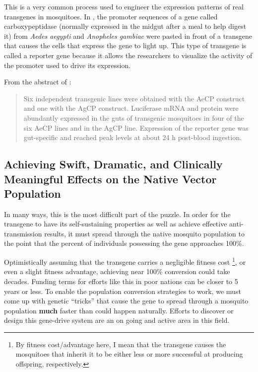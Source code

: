 This is a very common process used to engineer the expression patterns of real transgenes in mosquitoes.
In \cite{Moreira2000}, the promoter sequences of a gene called carboxypeptidase (normally expressed in the midgut after a meal to help digest it) from \emph{Aedes aegypti} and \emph{Anopheles gambiae} were pasted in front of a transgene that causes the cells that express the gene to light up.
This type of transgene is called a \gls{reporter gene} because it allows the researchers to visualize the activity of the promoter used to drive its expression.

From the abstract of \cite{Moreira2000}:

\begin{quote}
Six independent transgenic lines were obtained with the AeCP construct and one with the
AgCP
construct.
Luciferase mRNA and protein were abundantly expressed in the
guts of transgenic mosquitoes in four of the six AeCP lines and in the
AgCP line.
Expression of the reporter gene was gut-specific and reached
peak levels at about 24 h post-blood ingestion.
\end{quote}

\subsection{Achieving Swift, Dramatic, and Clinically Meaningful Effects on the Native Vector Population}

In many ways, this is the most difficult part of the puzzle.
In order for the transgene to have its self-sustaining properties as well as achieve effective anti-transmission results, it must spread through the native mosquito population to the point that the percent of individuals possessing the gene approaches 100\%.

Optimistically assuming that the transgene carries a negligible fitness cost
\footnote{By fitness cost/advantage here, I mean that the transgene
    causes the mosquitoes that inherit it to be either less or more
    successful at producing offspring, respectively.},
or even a slight fitness advantage, achieving near 100\% conversion could take decades.
Funding terms for efforts like this in poor nations can be closer to 5 years or less.
To enable the population conversion strategies to work, we must come up with genetic ``tricks'' that cause the gene to spread through a mosquito population \textbf{much} faster than could happen naturally.
Efforts to discover or design this \gls{gene-drive} system are an on going and active area in this field.





